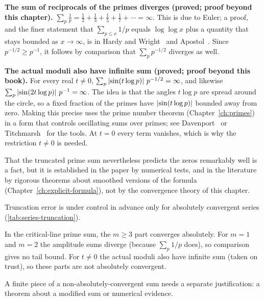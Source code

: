 \begin{beyond}
\textbf{The sum of reciprocals of the primes diverges (proved; proof beyond this chapter).} $\sum_p\frac1p=\frac12+\frac13+\frac15+\frac17+\cdots=\infty$. This is due to Euler; a proof, and the finer statement that $\sum_{p\le x}1/p$ equals $\log\log x$ plus a quantity that stays bounded as $x\to\infty$, is in Hardy and Wright~\cite{hardywright} and Apostol~\cite{apostol}. Since $p^{-1/2}\ge p^{-1}$, it follows by comparison that $\sum_pp^{-1/2}$ diverges as well.
\end{beyond}

\begin{beyond}
\textbf{The actual moduli also have infinite sum (proved; proof beyond this book).} For every real $t\ne0$, $\sum_p\left\lvert \sin(t\log p)\right\rvert\,p^{-1/2}=\infty$, and likewise $\sum_p\left\lvert \sin(2t\log p)\right\rvert\,p^{-1}=\infty$. The idea is that the angles $t\log p$ are spread around the circle, so a fixed fraction of the primes have $\left\lvert \sin(t\log p)\right\rvert$ bounded away from zero. Making this precise uses the prime number theorem (Chapter~\ref{ch:primes}) in a form that controls oscillating sums over primes; see Davenport~\cite{davenport} or Titchmarsh~\cite{titchmarsh} for the tools. At $t=0$ every term vanishes, which is why the restriction $t\ne0$ is needed.
\end{beyond}

That the truncated prime sum nevertheless predicts the zeros remarkably well is a fact, but it is established in the paper by numerical tests, and in the literature by rigorous theorems about smoothed versions of the formula (Chapter~\ref{ch:explicit-formula}), not by the convergence theory of this chapter.

\begin{keyideas}
\item Truncation error is under control in advance only for absolutely convergent series (\cref{tab:series-truncation}).
\item In the critical-line prime sum, the $m\ge3$ part converges absolutely. For $m=1$ and $m=2$ the amplitude sums diverge (because $\sum_p1/p$ does), so comparison gives no tail bound. For $t\ne0$ the actual moduli also have infinite sum (taken on trust), so these parts are not absolutely convergent.
\item A finite piece of a non-absolutely-convergent sum needs a separate justification: a theorem about a modified sum or numerical evidence.
\end{keyideas}

